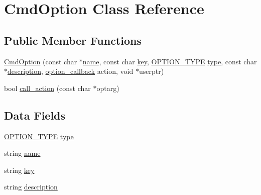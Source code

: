 \hypertarget{classCmdOption}{
\section{\-Cmd\-Option \-Class \-Reference}
\label{classCmdOption}
}
\subsection*{\-Public \-Member \-Functions}
\begin{DoxyCompactItemize}
\item 
\hyperlink{classCmdOption_aae07c82208e2d60590f66d8f521c5351}{\-Cmd\-Option} (const char $\ast$\hyperlink{classCmdOption_ab497267003660f7ded144742ca959b17}{name}, const char \hyperlink{classCmdOption_a35e6bd03bd85d22f6cec9320607a3f4f}{key}, \hyperlink{Cmdparser_8cc_aafe320ecc2bd334e1ff9fe12076ccffc}{\-O\-P\-T\-I\-O\-N\-\_\-\-T\-Y\-P\-E} \hyperlink{classCmdOption_a4f7842ecea0fa864e6714109b30d94ff}{type}, const char $\ast$\hyperlink{classCmdOption_ac32fa75074204c87679faaf974bf5772}{description}, \hyperlink{Cmdparser_8cc_a630a2fcd70be2057ccf9ac05dc67a463}{option\-\_\-callback} action, void $\ast$userptr)
\item 
bool \hyperlink{classCmdOption_ab50d5c759c9e4b5a0b0576b6e42c595f}{call\-\_\-action} (const char $\ast$optarg)
\end{DoxyCompactItemize}
\subsection*{\-Data \-Fields}
\begin{DoxyCompactItemize}
\item 
\hyperlink{Cmdparser_8cc_aafe320ecc2bd334e1ff9fe12076ccffc}{\-O\-P\-T\-I\-O\-N\-\_\-\-T\-Y\-P\-E} \hyperlink{classCmdOption_a4f7842ecea0fa864e6714109b30d94ff}{type}
\item 
string \hyperlink{classCmdOption_ab497267003660f7ded144742ca959b17}{name}
\item 
string \hyperlink{classCmdOption_a35e6bd03bd85d22f6cec9320607a3f4f}{key}
\item 
string \hyperlink{classCmdOption_ac32fa75074204c87679faaf974bf5772}{description}
\end{DoxyCompactItemize}


